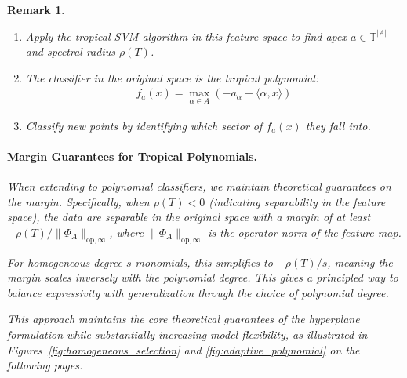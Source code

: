\documentclass{article}
\newtheorem{remark}{Remark}
\newcommand{\trop}{\mathbb{T}}
\begin{document}
\begin{remark}
\begin{enumerate}
    \item Apply the tropical SVM algorithm in this feature space to find apex $a \in \trop^{|A|}$ and spectral radius $\rho(T)$.
    
    \item The classifier in the original space is the tropical polynomial:
    \begin{align}
    f_a(x) = \max_{\alpha \in A} (-a_\alpha + \langle \alpha, x \rangle)
    \end{align}
    
    \item Classify new points by identifying which sector of $f_a(x)$ they fall into.
\end{enumerate}

\paragraph{Margin Guarantees for Tropical Polynomials.}
When extending to polynomial classifiers, we maintain theoretical guarantees on the margin. Specifically, when $\rho(T)<0$ (indicating separability in the feature space), the data are separable in the original space with a margin of at least $-\rho(T)/\lVert \Phi_A\rVert_{\text{op},\infty}$, where $\lVert \Phi_A\rVert_{\text{op},\infty}$ is the operator norm of the feature map.

For homogeneous degree-$s$ monomials, this simplifies to $-\rho(T)/s$, meaning the margin scales inversely with the polynomial degree. This gives a principled way to balance expressivity with generalization through the choice of polynomial degree.

This approach maintains the core theoretical guarantees of the hyperplane formulation while substantially increasing model flexibility, as illustrated in Figures~\ref{fig:homogeneous_selection} and \ref{fig:adaptive_polynomial} on the following pages.

\newpage


\end{remark}
\end{document}
